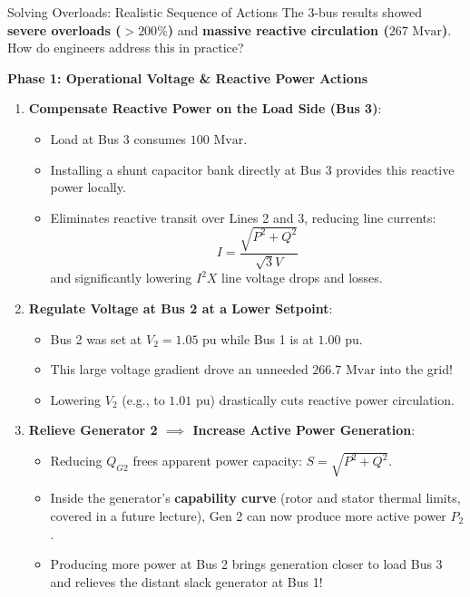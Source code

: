 \begin{frame}[allowframebreaks]{Solving Overloads: Realistic Sequence of Actions}
    The 3-bus results showed \alert{\textbf{severe overloads ($>200\%$)}} and \alert{\textbf{massive reactive circulation ($267\text{ Mvar}$)}}. How do engineers address this in practice?

    \vspace{0.15cm}
    \textbf{Phase 1: Operational Voltage \& Reactive Power Actions}
    \begin{enumerate}
        \item \textbf{Compensate Reactive Power on the Load Side (Bus 3)}:
        \begin{itemize}
            \item Load at Bus 3 consumes $100\text{ Mvar}$.
            \item Installing a shunt capacitor bank directly at Bus 3 provides this reactive power locally.
            \item Eliminates reactive transit over Lines 2 and 3, reducing line currents:
            $$I = \frac{\sqrt{P^2 + Q^2}}{\sqrt{3} V}$$
            and significantly lowering $I^2 X$ line voltage drops and losses.
        \end{itemize}
        \vspace{0.1cm}
        \item \textbf{Regulate Voltage at Bus 2 at a Lower Setpoint}:
        \begin{itemize}
            \item Bus 2 was set at $V_2 = 1.05\text{ pu}$ while Bus 1 is at $1.00\text{ pu}$.
            \item This large voltage gradient drove an unneeded $266.7\text{ Mvar}$ into the grid!
            \item Lowering $V_2$ (e.g., to $1.01\text{ pu}$) drastically cuts reactive power circulation.
        \end{itemize}
        \vspace{0.1cm}
        \item \textbf{Relieve Generator 2 $\implies$ Increase Active Power Generation}:
        \begin{itemize}
            \item Reducing $Q_{G2}$ frees apparent power capacity: $S = \sqrt{P^2 + Q^2}$.
            \item Inside the generator's \textbf{capability curve} (rotor and stator thermal limits, covered in a future lecture), Gen 2 can now produce more active power $P_2$.
            \item Producing more power at Bus 2 brings generation closer to load Bus 3 and relieves the distant slack generator at Bus 1!
        \end{itemize}
    \end{enumerate}


\end{frame}
